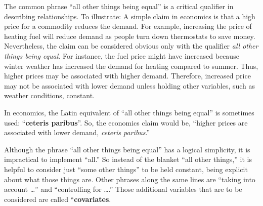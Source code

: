 \documentclass[
  letterpaper,
  DIV=11,
  numbers=noendperiod,
  oneside]{scrreprt}
\begin{document}
The common phrase ``all other things being equal'' is a critical
qualifier in describing relationships. To illustrate: A simple claim in
economics is that a high price for a commodity reduces the demand. For
example, increasing the price of heating fuel will reduce demand as
people turn down thermostats to save money. Nevertheless, the claim can
be considered obvious only with the qualifier \emph{all other things
being equal}. For instance, the fuel price might have increased because
winter weather has increased the demand for heating compared to summer.
Thus, higher prices may be associated with higher demand. Therefore,
increased price may not be associated with lower demand unless holding
other variables, such as weather conditions, constant.

In economics, the Latin equivalent of ``all other things being equal''
is sometimes used: ``\textbf{ceteris paribus}''. So, the economics claim
would be, ``higher prices are associated with lower demand,
\emph{ceteris paribus}.''

Although the phrase ``all other things being equal'' has a logical
simplicity, it is impractical to implement ``all.'' So instead of the
blanket ``all other things,'' it is helpful to consider just ``some
other things'' to be held constant, being explicit about what those
things are. Other phrases along the same lines are ``taking into account
\ldots{}'' and ``controlling for \ldots.'' Those additional variables
that are to be considered are called ``\textbf{covariates}.
\end{document}
